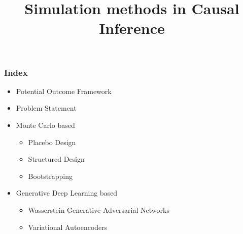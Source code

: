\documentclass{beamer}
\begin{document}
\title{Simulation methods in Causal Inference}
\date{}
\maketitle

\begin{frame}
	\frametitle{Index}
	\begin{itemize}
		\item Potential Outcome Framework
		\item Problem Statement
		\item Monte Carlo based
			\begin{itemize}
				\item Placebo Design
				\item Structured Design
				\item Bootstrapping
			\end{itemize}
		\item Generative Deep Learning based
			\begin{itemize}
				\item Wasserstein Generative Adversarial Networks
				\item Variational Autoencoders
			\end{itemize}
	\end{itemize}
\end{frame}
\end{document}
